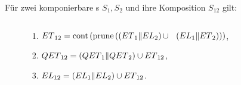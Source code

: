 \begin{frame}
  \small
  \begin{satz}
    Für zwei komponierbare \EIO{}s $S_1, S_2$ und ihre Komposition
    $S_{12}$ gilt:
  \begin{columns}[]
    \begin{column}{.05\textwidth}
    \end{column}
    \begin{column}{.42\textwidth}
      \begin{block}{}
        \begin{enumerate}
          \item $ET{}_{12}=\mathrm{cont} \left(\mathrm{prune}
              \left(\left(ET{}_1\|EL{}_2\right)\cup\right.\right.$
            $\left.\left.\left(EL{}_1\|ET{}_2\right)\right)\right)$,
          \item $QET{}_{12}=(QET{}_1\|QET{}_2)\cup ET{}_{12}$,
          \item $EL{}_{12}=(EL{}_1\|EL{}_2)\cup ET{}_{12}$.
        \end{enumerate}
      \end{block}
    \end{column}
    \begin{column}{.05\textwidth}
    \end{column}
    \begin{column}{.42\textwidth}
    \end{column}
    \begin{column}{.05\textwidth}
    \end{column}
  \end{columns}
  \end{satz}
\end{frame}

